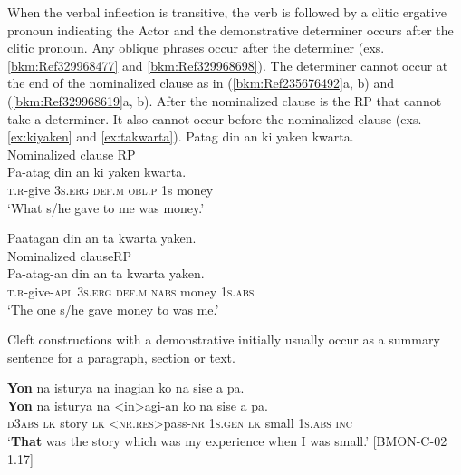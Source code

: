 When the verbal inflection is transitive, the verb is followed by a clitic ergative pronoun indicating the Actor and the demonstrative determiner occurs after the clitic pronoun. Any oblique phrases occur after the determiner (exs. \ref{bkm:Ref329968477} and \ref{bkm:Ref329968698}). The determiner cannot occur at the end of the nominalized clause as in (\ref{bkm:Ref235676492}a, b) and (\ref{bkm:Ref329968619}a, b). After the nominalized clause is the RP that cannot take a determiner. It also cannot occur before the nominalized clause (exs. \ref{ex:kiyaken} and \ref{ex:takwarta}).
\ea 
\label{bkm:Ref329968477}
Patag  din  an  ki  yaken  kwarta. \\\smallskip
Nominalized clause     \hspace{2.5cm} RP \\
\gll Pa-atag  din  an  ki  yaken  kwarta. \\
\textsc{t.r}-give  3\textsc{s.erg}  \textsc{def.m}  \textsc{obl.p}  1s  money \\
\glt ‘What s/he gave to me was money.’
\z

\ea
\label{bkm:Ref235676492}
    \z
\z
\ea 
\label{bkm:Ref329968698}
Paatagan  din  an  ta  kwarta  yaken. \\\smallskip
Nominalized clause\hspace{3.6cm}RP \\
\gll Pa-atag-an  din  an  ta  kwarta  yaken. \\
\textsc{t.r}-give-\textsc{apl}  3\textsc{s.erg}  \textsc{def.m}  \textsc{nabs}  money  1\textsc{s.abs} \\
\glt ‘The one s/he gave money to was me.’
\z
\ea 
\label{bkm:Ref329968619}
    \z
\z

Cleft constructions with a demonstrative initially usually occur as a summary sentence for a paragraph, section or text.

\newpage
\ea 
\textbf{Yon}  na  isturya  na  inagian  ko  na  sise  a  pa. \\\smallskip
\gll \textbf{Yon}  na  isturya  na  <in>agi-an  ko  na  sise  a  pa. \\
\textsc{d}3\textsc{abs}  \textsc{lk}  story  \textsc{lk}  <\textsc{nr.res}>pass-\textsc{nr}  1\textsc{s.gen}  \textsc{lk}  small  1\textsc{s.abs}  \textsc{inc} \\
\glt ‘\textbf{That} was the story which was my experience when I was small.’ [BMON-C-02 1.17]
\z

